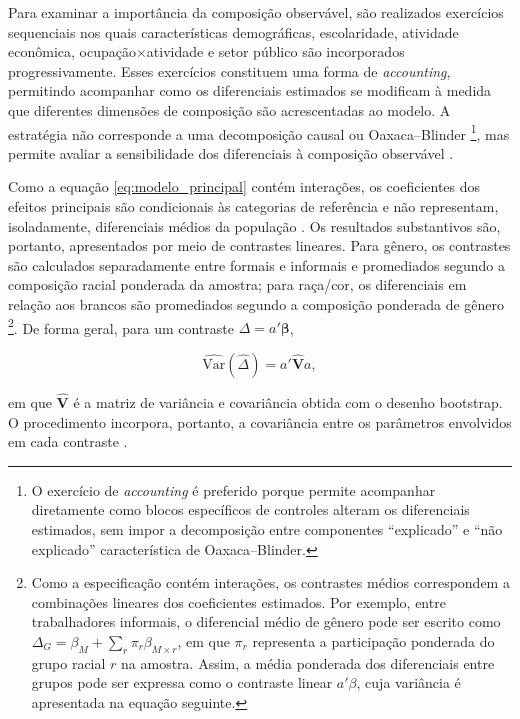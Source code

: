 \documentclass[12pt,a4paper]{article}
\begin{document}
Para examinar a importância da composição observável, 
são realizados exercícios sequenciais nos quais características demográficas, 
escolaridade, atividade econômica, ocupação$\times$atividade e setor público são
incorporados progressivamente. Esses exercícios constituem uma forma de 
\textit{accounting}, permitindo acompanhar como os diferenciais estimados 
se modificam à medida que diferentes dimensões de composição são acrescentadas 
ao modelo. A estratégia não corresponde a uma decomposição causal ou Oaxaca–Blinder
\footnote{O exercício de \textit{accounting} é preferido porque permite acompanhar diretamente 
como blocos específicos de controles alteram os diferenciais estimados, sem impor a 
decomposição entre componentes ``explicado'' e ``não explicado'' característica de 
Oaxaca--Blinder.}, mas permite avaliar a sensibilidade dos diferenciais à composição 
observável \citep{wooldridge2010econometric}.

Como a equação \eqref{eq:modelo_principal} contém interações, os coeficientes dos
efeitos principais são condicionais às categorias de referência e não
representam, isoladamente, diferenciais médios da população
\citep{brambor2006understanding}. Os resultados substantivos são, portanto,
apresentados por meio de contrastes lineares. Para gênero, os contrastes são
calculados separadamente entre formais e informais e promediados segundo a composição racial 
ponderada da amostra; para raça/cor, os diferenciais em
relação aos brancos são promediados segundo a composição ponderada de gênero
\footnote{Como a especificação contém interações, os contrastes médios 
correspondem a combinações lineares dos coeficientes estimados. Por exemplo, 
entre trabalhadores informais, o diferencial médio de gênero pode ser escrito
como $\Delta_G=\beta_M+\sum_r \pi_r\beta_{M\times r}$,
em que $\pi_r$ representa a participação ponderada do grupo racial $r$ na amostra.
Assim, a média ponderada dos diferenciais entre grupos pode ser expressa como o 
contraste linear $a'\beta$, cuja variância é apresentada na equação seguinte.}. De
forma geral, para um contraste $\Delta=a'\boldsymbol{\beta}$,

\begin{equation}
    \widehat{\mathrm{Var}}(\widehat{\Delta})
    =
    a'\widehat{\mathbf V}a,
    \label{eq:contraste}
\end{equation}

\noindent
em que $\widehat{\mathbf V}$ é a matriz de variância e covariância obtida com o
desenho bootstrap. O procedimento incorpora, portanto, a covariância entre os
parâmetros envolvidos em cada contraste \citep{lumley2010complex}.
\end{document}
